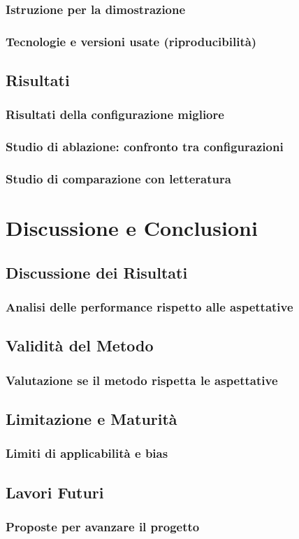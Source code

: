 \documentclass[12pt,a4paper,twoside]{article}
\begin{document}
\subsubsection*{Istruzione per la dimostrazione}
\subsubsection*{Tecnologie e versioni usate (riproducibilità)}

\subsection*{Risultati}
\subsubsection*{Risultati della configurazione migliore}
\subsubsection*{Studio di ablazione: confronto tra configurazioni}
\subsubsection*{Studio di comparazione con letteratura}


\newpage
\section{Discussione e Conclusioni}

\subsection*{Discussione dei Risultati}
\subsubsection*{Analisi delle performance rispetto alle aspettative}

\subsection*{Validità del Metodo}
\subsubsection*{Valutazione se il metodo rispetta le aspettative}

\subsection*{Limitazione e Maturità}
\subsubsection*{Limiti di applicabilità e bias}

\subsection*{Lavori Futuri}
\subsubsection*{Proposte per avanzare il progetto}
\end{document}
